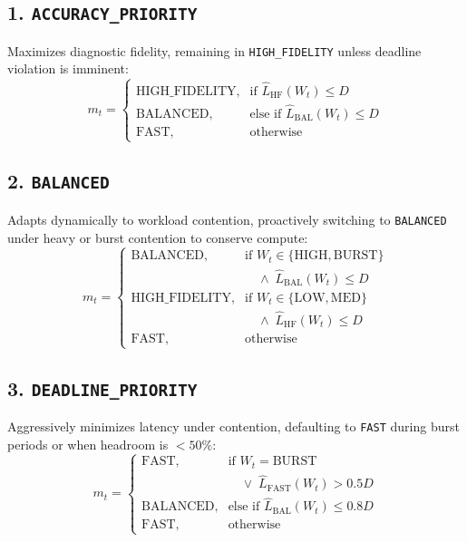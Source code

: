 \documentclass[journal]{IEEEtran}
\begin{document}
\subsection{1. \texttt{ACCURACY\_PRIORITY}}
Maximizes diagnostic fidelity, remaining in \texttt{HIGH\_FIDELITY} unless deadline violation is imminent:
\begin{equation}
    m_t = \begin{cases}
    \text{HIGH\_FIDELITY}, & \text{if } \hat{L}_{\text{HF}}(W_t) \le D \\
    \text{BALANCED}, & \text{else if } \hat{L}_{\text{BAL}}(W_t) \le D \\
    \text{FAST}, & \text{otherwise}
    \end{cases}
\end{equation}

\subsection{2. \texttt{BALANCED}}
Adapts dynamically to workload contention, proactively switching to \texttt{BALANCED} under heavy or burst contention to conserve compute:
\begin{equation}
    m_t = \begin{cases}
    \text{BALANCED}, & \text{if } W_t \in \{\text{HIGH}, \text{BURST}\} \\
                     & \quad \land\; \hat{L}_{\text{BAL}}(W_t) \le D \\
    \text{HIGH\_FIDELITY}, & \text{if } W_t \in \{\text{LOW}, \text{MED}\} \\
                           & \quad \land\; \hat{L}_{\text{HF}}(W_t) \le D \\
    \text{FAST}, & \text{otherwise}
    \end{cases}
\end{equation}

\subsection{3. \texttt{DEADLINE\_PRIORITY}}
Aggressively minimizes latency under contention, defaulting to \texttt{FAST} during burst periods or when headroom is $<50\%$:
\begin{equation}
    m_t = \begin{cases}
    \text{FAST}, & \text{if } W_t = \text{BURST} \\
                 & \quad \lor\; \hat{L}_{\text{FAST}}(W_t) > 0.5 D \\
    \text{BALANCED}, & \text{else if } \hat{L}_{\text{BAL}}(W_t) \le 0.8 D \\
    \text{FAST}, & \text{otherwise}
    \end{cases}
\end{equation}
\end{document}
